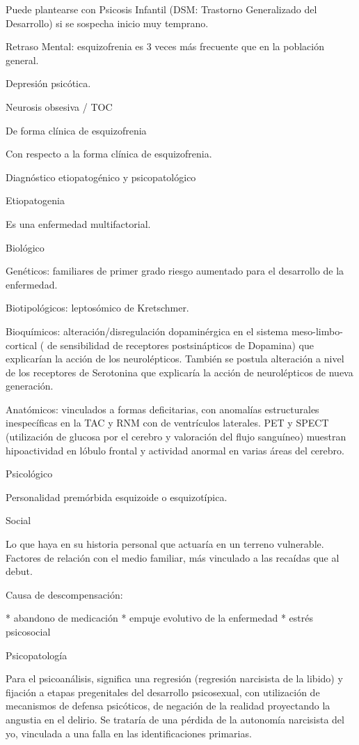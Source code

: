 Puede plantearse con Psicosis Infantil (DSM: Trastorno Generalizado del Desarrollo) si se sospecha inicio muy temprano.

Retraso Mental: esquizofrenia es 3 veces más frecuente que en la población general.

Depresión psicótica.

Neurosis obsesiva / TOC

De forma clínica de esquizofrenia

Con respecto a la forma clínica de esquizofrenia.

Diagnóstico etiopatogénico y psicopatológico

Etiopatogenia

Es una enfermedad multifactorial.

Biológico

Genéticos: familiares de primer grado riesgo aumentado para el desarrollo de la enfermedad.

Biotipológicos: leptosómico de Kretschmer.

Bioquímicos: alteración/disregulación dopaminérgica en el sistema meso-limbo-cortical ( de sensibilidad de receptores postsinápticos de Dopamina) que explicarían la acción de los neurolépticos. También se postula alteración a nivel de los receptores de Serotonina que explicaría la acción de neurolépticos de nueva generación.

Anatómicos: vinculados a formas deficitarias, con anomalías estructurales inespecíficas en la TAC y RNM con de ventrículos laterales. PET y SPECT (utilización de glucosa por el cerebro y valoración del flujo sanguíneo) muestran hipoactividad en lóbulo frontal y actividad anormal en varias áreas del cerebro.

Psicológico

Personalidad premórbida esquizoide o esquizotípica.

Social

Lo que haya en su historia personal que actuaría en un terreno vulnerable. Factores de relación con el medio familiar, más vinculado a las recaídas que al debut.

Causa de descompensación:

* abandono de medicación
* empuje evolutivo de la enfermedad
* estrés psicosocial

Psicopatología

Para el psicoanálisis, significa una regresión (regresión narcisista de la libido) y fijación a etapas pregenitales del desarrollo psicosexual, con utilización de mecanismos de defensa psicóticos, de negación de la realidad proyectando la angustia en el delirio. Se trataría de una pérdida de la autonomía narcisista del yo, vinculada a una falla en las identificaciones primarias.

